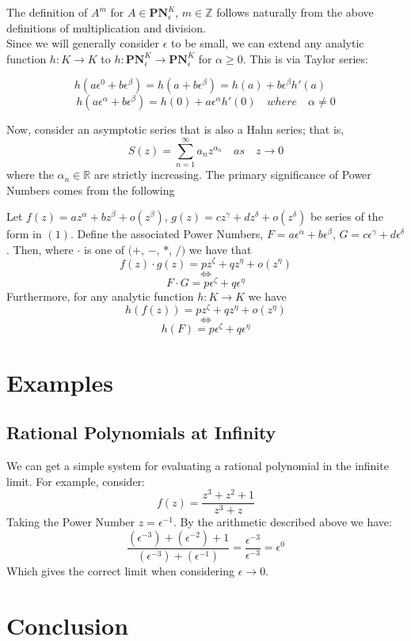 \documentclass[acmsmall]{acmart}
\begin{document}
The definition of $A^m$ for $A \in \mathbf{PN}^K_\epsilon$, $m \in \mathbb{Z}$ follows naturally from the above definitions of multiplication and division. \\
Since we will generally consider $\epsilon$ to be small, we can extend any analytic function $h:K \rightarrow K$ to $h:\mathbf{PN}^K_{\epsilon} \rightarrow \mathbf{PN}^K_{\epsilon}$ for $\alpha \geq 0$. This is via Taylor series:

$$h(a\epsilon^0+b\epsilon^\beta) = h(a+b\epsilon^\beta) = h(a) + b\epsilon^\beta h'(a) \quad$$
$$h(a\epsilon^\alpha+b\epsilon^\beta) = h(0) + a\epsilon^\alpha h'(0) \quad where \quad \alpha \neq 0$$

Now, consider an asymptotic series that is also a Hahn series; that is,
\begin{equation}
S(z) = \sum_{n=1}^{\infty}a_nz^{\alpha_n} \quad as \quad z \rightarrow 0
\end{equation}
where the $\alpha_n \in \mathbb{R}$ are strictly increasing.
The primary significance of Power Numbers comes from the following 
\begin{proposition}
	Let $f(z) = az^\alpha + bz^\beta + o(z^\beta)$,	$g(z) = cz^\gamma + dz^\delta + o(z^\delta)$ be series of the form in $(1)$.
	Define the associated Power Numbers, $F = a\epsilon^\alpha + b\epsilon^\beta$, $G = c\epsilon^\gamma + d\epsilon^\delta$.
	Then, where $\cdot$ is one of $(+$, $-$, $*$, $/)$ we have that 
	$$f(z) \cdot g(z) = pz^\zeta + qz^\eta + o(z^\eta)$$
	$$\Leftrightarrow$$
	$$F \cdot G = p\epsilon^\zeta + q\epsilon^\eta$$
	Furthermore, for any analytic function $h:K \rightarrow K$ we have
	$$h(f(z)) = pz^\zeta + qz^\eta + o(z^\eta)$$ 
	$$\Leftrightarrow$$
	$$h(F) = p\epsilon^\zeta + q\epsilon^\eta$$
\end{proposition}

\section{Examples}

\subsection{Rational Polynomials at Infinity}
We can get a simple system for evaluating a rational polynomial in the infinite limit. For example, consider:
$$f(z) = \frac{z^3+z^2+1}{z^3+z}$$
Taking the Power Number $z = \epsilon^{-1}$. By the arithmetic described above we have:
$$\frac{(\epsilon^{-3})+(\epsilon^{-2})+1}{(\epsilon^{-3})+(\epsilon^{-1})} = \frac{\epsilon^{-3}}{\epsilon^{-3}}=\epsilon^0$$
Which gives the correct limit when considering $\epsilon \rightarrow 0$.


\section{Conclusion}
\end{document}
